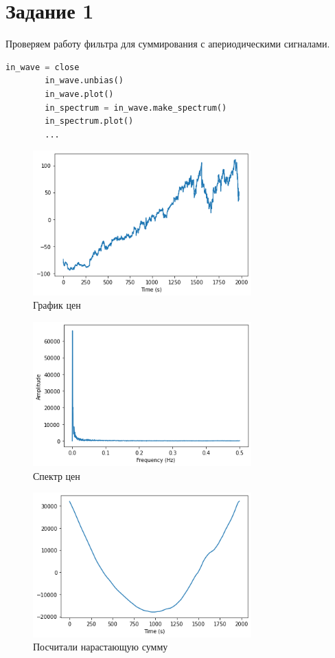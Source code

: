\documentclass[a4paper, 12pt]{report}
\begin{document}
	\section{Задание 1}
	Проверяем работу фильтра для суммирования с апериодическими сигналами.
	\begin{lstlisting}[language=Python,caption=Возьмем акции Facebook и повторим все действия из предыдущей главы]
		in_wave = close
		in_wave.unbias()
		in_wave.plot()
		in_spectrum = in_wave.make_spectrum()
		in_spectrum.plot()
		...
	\end{lstlisting}
	\begin{figure}[H]
		\centering
		\includegraphics[width=0.75\textwidth]{test1.png}
		\caption{График цен}
		\label{fig:test1}
	\end{figure}
	\begin{figure}[H]
		\centering
		\includegraphics[width=0.75\textwidth]{test2.png}
		\caption{Спектр цен}
		\label{fig:test2}
	\end{figure}
	\begin{figure}[H]
		\centering
		\includegraphics[width=0.75\textwidth]{test3.png}
		\caption{Посчитали нарастающую сумму}
		\label{fig:test3}
	\end{figure}
\end{document}
